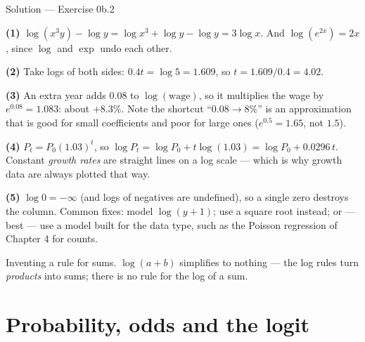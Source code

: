 \documentclass[aspectratio=169,11pt]{beamer}
\begin{document}
\begin{frame}{Solution --- Exercise 0b.2}
  \begin{solutionbox}
    \textbf{(1)} $\log(x^3y) - \log y = \log x^3 + \log y - \log y =
    3\log x$. And $\log(e^{2x}) = 2x$, since $\log$ and $\exp$ undo each
    other.

    \textbf{(2)} Take logs of both sides: $0.4t = \log 5 = 1.609$, so
    $t = 1.609/0.4 = \mathbf{4.02}$.

    \textbf{(3)} An extra year adds $0.08$ to $\log(\text{wage})$, so it
    multiplies the wage by $e^{0.08} = 1.083$: about $\mathbf{+8.3\%}$. Note
    the shortcut ``$0.08 \to 8\%$'' is an approximation that is good for small
    coefficients and poor for large ones ($e^{0.5} = 1.65$, not $1.5$).

    \textbf{(4)} $P_t = P_0(1.03)^t$, so
    $\log P_t = \log P_0 + t\log(1.03) = \log P_0 + 0.0296\,t$. Constant
    \emph{growth rates} are straight lines on a log scale --- which is why
    growth data are always plotted that way.

    \textbf{(5)} $\log 0 = -\infty$ (and logs of negatives are undefined), so a
    single zero destroys the column. Common fixes: model $\log(y + 1)$; use a
    square root instead; or --- best --- use a model built for the data type,
    such as the Poisson regression of Chapter 4 for counts.
  \end{solutionbox}
  \begin{mistake}
    Inventing a rule for sums. $\log(a+b)$
    simplifies to nothing --- the log rules turn \emph{products} into sums;
    there is no rule for the log of a sum.
  \end{mistake}
\end{frame}


\section{Probability, odds and the logit}
\end{document}
